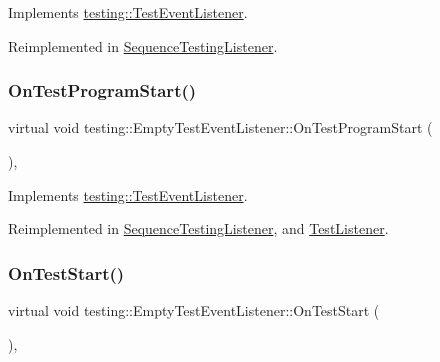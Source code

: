 Implements \mbox{\hyperlink{classtesting_1_1TestEventListener_ad15b6246d94c268e233487a86463ef3d}{testing\+::\+Test\+Event\+Listener}}.



Reimplemented in \mbox{\hyperlink{classSequenceTestingListener_aacac5e15bac089460841ff63a5c31f57}{Sequence\+Testing\+Listener}}.

\mbox{\label{classtesting_1_1EmptyTestEventListener_aa3847c8a3c22d8d69a6006dfdd6589fc}} 
\subsubsection{\texorpdfstring{OnTestProgramStart()}{OnTestProgramStart()}}
{\footnotesize\ttfamily virtual void testing\+::\+Empty\+Test\+Event\+Listener\+::\+On\+Test\+Program\+Start (\begin{DoxyParamCaption}\item[{const \mbox{\hyperlink{classtesting_1_1UnitTest}{Unit\+Test}} \&}]{ }\end{DoxyParamCaption})\hspace{0.3cm}{\ttfamily [inline]}, {\ttfamily [virtual]}}



Implements \mbox{\hyperlink{classtesting_1_1TestEventListener_a5f6c84f39851e8a603a2d2e10063816b}{testing\+::\+Test\+Event\+Listener}}.



Reimplemented in \mbox{\hyperlink{classSequenceTestingListener_a25b96acdbaa6f582e583e6b56bd39b42}{Sequence\+Testing\+Listener}}, and \mbox{\hyperlink{classTestListener_a6218f522f5b6b37050ff0ea630ac5fd3}{Test\+Listener}}.

\mbox{\label{classtesting_1_1EmptyTestEventListener_a84fa74cc9ba742f9f847ea405ca84e5e}} 
\subsubsection{\texorpdfstring{OnTestStart()}{OnTestStart()}}
{\footnotesize\ttfamily virtual void testing\+::\+Empty\+Test\+Event\+Listener\+::\+On\+Test\+Start (\begin{DoxyParamCaption}\item[{const \mbox{\hyperlink{classtesting_1_1TestInfo}{Test\+Info}} \&}]{ }\end{DoxyParamCaption})\hspace{0.3cm}{\ttfamily [inline]}, {\ttfamily [virtual]}}



